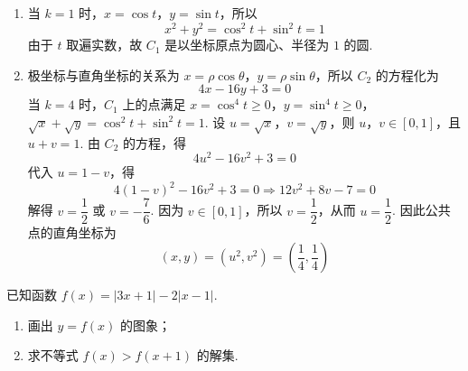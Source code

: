 \begin{solution}
\begin{enumerate}
\item 当 \(k=1\) 时，\(x=\cos t\)，\(y=\sin t\)，所以
\[
x^2+y^2=\cos^2t+\sin^2t=1
\]
由于 \(t\) 取遍实数，故 \(C_1\) 是以坐标原点为圆心、半径为 \(1\) 的圆.

\item 极坐标与直角坐标的关系为 \(x=\rho\cos\theta\)，\(y=\rho\sin\theta\)，所以 \(C_2\) 的方程化为
\[
4x-16y+3=0
\]
当 \(k=4\) 时，\(C_1\) 上的点满足
\(x=\cos^4t\ge0\)，\(y=\sin^4t\ge0\)，\(\sqrt{x}+\sqrt{y}=\cos^2t+\sin^2t=1\).
设 \(u=\sqrt{x}\)，\(v=\sqrt{y}\)，则 \(u\)，\(v\in[0,1]\)，且 \(u+v=1\). 由 \(C_2\) 的方程，得
\[
4u^2-16v^2+3=0
\]
代入 \(u=1-v\)，得
\[
4(1-v)^2-16v^2+3=0
\Longrightarrow 12v^2+8v-7=0
\]
解得 \(v=\dfrac12\) 或 \(v=-\dfrac76\). 因为 \(v\in[0,1]\)，所以 \(v=\dfrac12\)，从而 \(u=\dfrac12\). 因此公共点的直角坐标为
\[
\left(x,y\right)=\left(u^2,v^2\right)=\left(\dfrac14,\dfrac14\right)
\]
\end{enumerate}
\end{solution}

\begin{problem}
已知函数 \(f(x)=\lvert 3x+1\rvert-2\lvert x-1\rvert\).

\begin{enumerate}
\item 画出 \(y=f(x)\) 的图象；

\item 求不等式 \(f(x)>f(x+1)\) 的解集.
\end{enumerate}

\end{problem}

